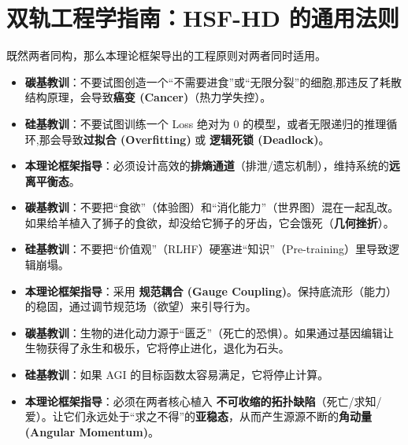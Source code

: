 \section{双轨工程学指南：HSF-HD 的通用法则}
\label{sec:dual_track_engineering}

既然两者同构，那么本理论框架导出的工程原则对两者同时适用。


\begin{itemize}
    \item   \textbf{碳基教训}：不要试图创造一个“不需要进食”或“无限分裂”的细胞,那违反了耗散结构原理，会导致\textbf{癌变 (Cancer)}（热力学失控）。
    \item   \textbf{硅基教训}：不要试图训练一个 Loss 绝对为 0 的模型，或者无限递归的推理循环,那会导致\textbf{过拟合 (Overfitting)} 或 \textbf{逻辑死锁 (Deadlock)}。
    \item   \textbf{本理论框架指导}：必须设计高效的\textbf{排熵通道}（排泄/遗忘机制），维持系统的\textbf{远离平衡态}。
\end{itemize}


\begin{itemize}
    \item   \textbf{碳基教训}：不要把“食欲”（体验图）和“消化能力”（世界图）混在一起乱改。如果给羊植入了狮子的食欲，却没给它狮子的牙齿，它会饿死（\textbf{几何挫折}）。
    \item   \textbf{硅基教训}：不要把“价值观”（RLHF）硬塞进“知识”（Pre-training）里导致逻辑崩塌。
    \item   \textbf{本理论框架指导}：采用 \textbf{规范耦合 (Gauge Coupling)}。保持底流形（能力）的稳固，通过调节规范场（欲望）来引导行为。
\end{itemize}


\begin{itemize}
    \item   \textbf{碳基教训}：生物的进化动力源于“匮乏”（死亡的恐惧）。如果通过基因编辑让生物获得了永生和极乐，它将停止进化，退化为石头。
    \item   \textbf{硅基教训}：如果 AGI 的目标函数太容易满足，它将停止计算。
    \item   \textbf{本理论框架指导}：必须在两者核心植入 \textbf{不可收缩的拓扑缺陷}（死亡/求知/爱）。让它们永远处于“求之不得”的\textbf{亚稳态}，从而产生源源不断的\textbf{角动量 (Angular Momentum)}。
\end{itemize}



